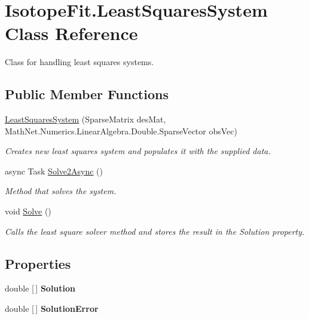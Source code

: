 \hypertarget{class_isotope_fit_1_1_least_squares_system}{}\section{Isotope\+Fit.\+Least\+Squares\+System Class Reference}
\label{class_isotope_fit_1_1_least_squares_system}


Class for handling least squares systems.  


\subsection*{Public Member Functions}
\begin{DoxyCompactItemize}
\item 
\hyperlink{class_isotope_fit_1_1_least_squares_system_a5e014a3cc9f4ee7b700d89de2d1f2a4d}{Least\+Squares\+System} (Sparse\+Matrix des\+Mat, Math\+Net.\+Numerics.\+Linear\+Algebra.\+Double.\+Sparse\+Vector obs\+Vec)
\begin{DoxyCompactList}\small\item\em Creates new least squares system and populates it with the supplied data. \end{DoxyCompactList}\item 
async Task \hyperlink{class_isotope_fit_1_1_least_squares_system_ad831a418d7e7601dc7a64f5f7143534f}{Solve2\+Async} ()
\begin{DoxyCompactList}\small\item\em Method that solves the system. \end{DoxyCompactList}\item 
void \hyperlink{class_isotope_fit_1_1_least_squares_system_ac72b8568e9ecb97077102658f56aba3f}{Solve} ()
\begin{DoxyCompactList}\small\item\em Calls the least square solver method and stores the result in the Solution property. \end{DoxyCompactList}\end{DoxyCompactItemize}
\subsection*{Properties}
\begin{DoxyCompactItemize}
\item 
\mbox{\label{class_isotope_fit_1_1_least_squares_system_a617be79d453e62bdd056dea7d66c8a9e}} 
double \mbox{[}$\,$\mbox{]} {\bfseries Solution}
\item 
\mbox{\label{class_isotope_fit_1_1_least_squares_system_a408575af0561c165c18bc2c93a046d00}} 
double \mbox{[}$\,$\mbox{]} {\bfseries Solution\+Error}
\end{DoxyCompactItemize}


